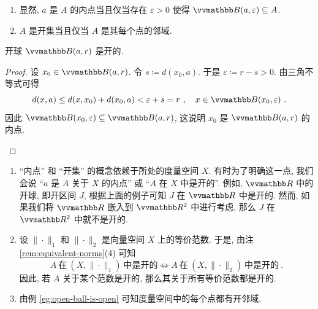 \begin{remark}
    \begin{enumerate}
        \item 显然, \(a\) 是 \(A\) 的内点当且仅当存在 \(\varepsilon > 0\) 使得 \(\B(a, \varepsilon) \subseteq A\).
        \item \(A\) 是开集当且仅当 \(A\) 是其每个点的邻域.
    \end{enumerate}
\end{remark}

\begin{example}\label{eg:open-ball-is-open}
    开球 \(\B(a, r)\) 是开的.
\end{example}

\begin{proof}
    设 \(x_0 \in \B(a, r)\). 令 \(s \coloneqq d(x_0, a)\). 于是 \(\varepsilon \coloneqq r - s > 0\). 由三角不等式可得
    \[
        d(x, a) \leq d(x, x_0) + d(x_0, a) < \varepsilon + s = r\ ,\quad x \in \B(x_0, \varepsilon)\ .
    \]
    因此 \(\B(x_0, \varepsilon) \subseteq \B(a, r)\), 这说明 \(x_0\) 是 \(\B(a, r)\) 的内点.
    \begin{center}
    \end{center}
\end{proof}

\begin{remark}\label{rem:open-set}
    \begin{enumerate}
        \item ``内点'' 和 ``开集'' 的概念依赖于所处的度量空间 \(X\). 有时为了明确这一点, 我们会说 ``\(a\) 是 \(A\) 关于 \(X\) 的内点'' 或 ``\(A\) 在 \(X\) 中是开的''. 例如, \(\R\) 中的开球, 即开区间 \(J\), 根据上面的例子可知 \(J\) 在 \(\R\) 中是开的. 然而, 如果我们将 \(\R\) 嵌入到 \(\R^2\) 中进行考虑, 那么 \(J\) 在 \(\R^2\) 中就不是开的.
        \item 设 \(\|\!\cdot\!\|_1\) 和 \(\|\!\cdot\!\|_2\) 是向量空间 \(X\) 上的等价范数. 于是, 由注 \ref{rem:equivalent-norms}(4) 可知
        \[
            A\ \text{在}\ (X, \|\!\cdot\!\|_1)\ \text{中是开的} \iff A\ \text{在}\ (X, \|\!\cdot\!\|_2)\ \text{中是开的}\ .
        \]
        因此, 若 \(A\) 关于某个范数是开的, 那么其关于所有等价范数都是开的.
        \item 由例 \ref{eg:open-ball-is-open} 可知度量空间中的每个点都有开邻域.
    \end{enumerate}
\end{remark}

